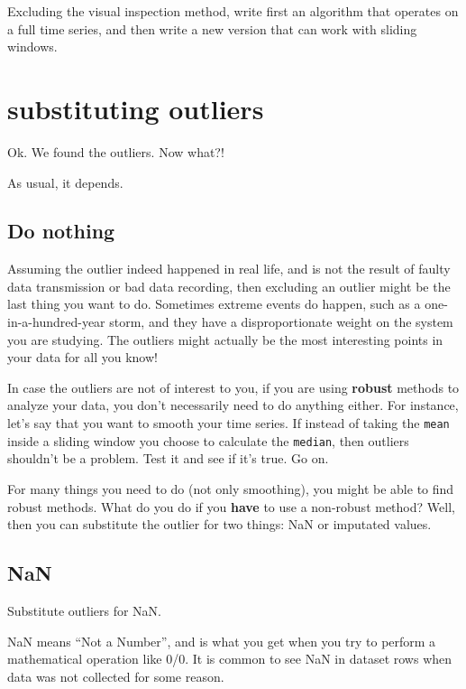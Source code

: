 \documentclass[
  letterpaper,
  DIV=11,
  numbers=noendperiod,
  oneside]{scrreprt}
\begin{document}
Excluding the visual inspection method, write first an algorithm that
operates on a full time series, and then write a new version that can
work with sliding windows.

\hypertarget{substituting-outliers}{%
\chapter{substituting outliers}\label{substituting-outliers}}

Ok. We found the outliers. Now what?!

As usual, it depends.

\hypertarget{do-nothing}{%
\section{Do nothing}\label{do-nothing}}

Assuming the outlier indeed happened in real life, and is not the result
of faulty data transmission or bad data recording, then excluding an
outlier might be the last thing you want to do. Sometimes extreme events
do happen, such as a one-in-a-hundred-year storm, and they have a
disproportionate weight on the system you are studying. The outliers
might actually be the most interesting points in your data for all you
know!

In case the outliers are not of interest to you, if you are using
\textbf{robust} methods to analyze your data, you don't necessarily need
to do anything either. For instance, let's say that you want to smooth
your time series. If instead of taking the \texttt{mean} inside a
sliding window you choose to calculate the \texttt{median}, then
outliers shouldn't be a problem. Test it and see if it's true. Go on.

For many things you need to do (not only smoothing), you might be able
to find robust methods. What do you do if you \textbf{have} to use a
non-robust method? Well, then you can substitute the outlier for two
things: NaN or imputated values.

\hypertarget{nan}{%
\section{NaN}\label{nan}}

Substitute outliers for NaN.

NaN means ``Not a Number'', and is what you get when you try to perform
a mathematical operation like 0/0. It is common to see NaN in dataset
rows when data was not collected for some reason.
\end{document}
